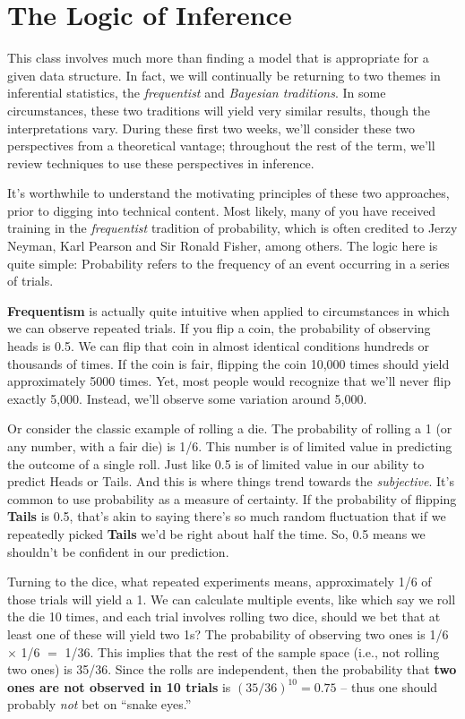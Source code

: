 \documentclass[
]{book}
\begin{document}
\section{The Logic of Inference}\label{the-logic-of-inference}

This class involves much more than finding a model that is appropriate for a given data structure. In fact, we will continually be returning to two themes in inferential statistics, the \emph{frequentist} and \emph{Bayesian traditions}. In some circumstances, these two traditions will yield very similar results, though the interpretations vary. During these first two weeks, we'll consider these two perspectives from a theoretical vantage; throughout the rest of the term, we'll review techniques to use these perspectives in inference.

It's worthwhile to understand the motivating principles of these two approaches, prior to digging into technical content. Most likely, many of you have received training in the \emph{frequentist} tradition of probability, which is often credited to Jerzy Neyman, Karl Pearson and Sir Ronald Fisher, among others. The logic here is quite simple: Probability refers to the frequency of an event occurring in a series of trials.

\textbf{Frequentism} is actually quite intuitive when applied to circumstances in which we can observe repeated trials. If you flip a coin, the probability of observing heads is 0.5. We can flip that coin in almost identical conditions hundreds or thousands of times. If the coin is fair, flipping the coin 10,000 times should yield approximately 5000 times. Yet, most people would recognize that we'll never flip exactly 5,000. Instead, we'll observe some variation around 5,000.

Or consider the classic example of rolling a die. The probability of rolling a 1 (or any number, with a fair die) is 1/6. This number is of limited value in predicting the outcome of a single roll. Just like 0.5 is of limited value in our ability to predict Heads or Tails. And this is where things trend towards the \emph{subjective}. It's common to use probability as a measure of certainty. If the probability of flipping \textbf{Tails} is 0.5, that's akin to saying there's so much random fluctuation that if we repeatedly picked \textbf{Tails} we'd be right about half the time. So, 0.5 means we shouldn't be confident in our prediction.

Turning to the dice, what repeated experiments means, approximately 1/6 of those trials will yield a 1. We can calculate multiple events, like which say we roll the die 10 times, and each trial involves rolling two dice, should we bet that at least one of these will yield two 1s? The probability of observing two ones is 1/6 \(\times\) 1/6 \(=\) 1/36. This implies that the rest of the sample space (i.e., not rolling two ones) is 35/36. Since the rolls are independent, then the probability that \textbf{two ones are not observed in 10 trials} is \((35/36)^{10}=0.75\) -- thus one should probably \emph{not} bet on ``snake eyes.''
\end{document}
